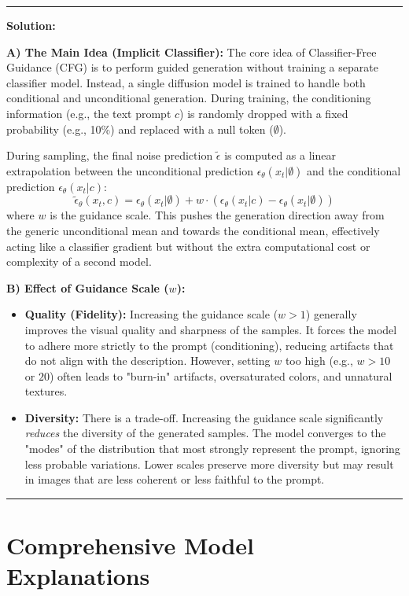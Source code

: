 \documentclass[a4paper,12pt]{article}
\newenvironment{solutionbox}{
    \par
    \vspace{0.5em}
    \noindent
    {\color{primary}\rule{\linewidth}{0.4pt}}
    \par\smallskip
    \noindent\textbf{\color{primary}Solution:}
    \par\smallskip
    \small
}{
    \par\smallskip
    {\color{primary}\rule{\linewidth}{0.4pt}}
    \par\vspace{0.5em}
}
\begin{document}
\begin{solutionbox}
    \textbf{A) The Main Idea (Implicit Classifier):}
    The core idea of Classifier-Free Guidance (CFG) is to perform guided generation without training a separate classifier model. Instead, a single diffusion model is trained to handle both conditional and unconditional generation. During training, the conditioning information (e.g., the text prompt $c$) is randomly dropped with a fixed probability (e.g., 10\%) and replaced with a null token ($\emptyset$).
    
    During sampling, the final noise prediction $\tilde{\epsilon}$ is computed as a linear extrapolation between the unconditional prediction $\epsilon_\theta(x_t|\emptyset)$ and the conditional prediction $\epsilon_\theta(x_t|c)$:
    \[ \tilde{\epsilon}_\theta(x_t, c) = \epsilon_\theta(x_t|\emptyset) + w \cdot (\epsilon_\theta(x_t|c) - \epsilon_\theta(x_t|\emptyset)) \]
    where $w$ is the guidance scale. This pushes the generation direction away from the generic unconditional mean and towards the conditional mean, effectively acting like a classifier gradient but without the extra computational cost or complexity of a second model.

    \textbf{B) Effect of Guidance Scale ($w$):}
    \begin{itemize}
        \item \textbf{Quality (Fidelity):} Increasing the guidance scale ($w > 1$) generally improves the visual quality and sharpness of the samples. It forces the model to adhere more strictly to the prompt (conditioning), reducing artifacts that do not align with the description. However, setting $w$ too high (e.g., $w > 10$ or $20$) often leads to "burn-in" artifacts, oversaturated colors, and unnatural textures.
        \item \textbf{Diversity:} There is a trade-off. Increasing the guidance scale significantly \textit{reduces} the diversity of the generated samples. The model converges to the "modes" of the distribution that most strongly represent the prompt, ignoring less probable variations. Lower scales preserve more diversity but may result in images that are less coherent or less faithful to the prompt.
    \end{itemize}
\end{solutionbox}


\section{Comprehensive Model Explanations}
\end{document}
